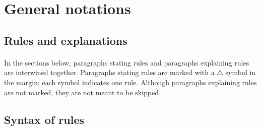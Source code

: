 \documentclass[%
	a4paper%
	,10pt%
	,twoside%
	,notitlepage%
]{article}%
\newcommand*{\ruleSymbol}{\textjapanese{⚠}}%
\begin{document}
\section{General notations}\label{sec:gen}%
% 
	\subsection{Rules and explanations}\label{subsec:rule}%
		\paragraph*{}In the sections below, paragraphs stating rules and paragraphs explaining rules are interwined together. Paragraphs stating rules are marked with a \ruleSymbol{} symbol in the margin; each symbol indicates one rule. Although paragraphs explaining rules are not marked, they are not meant to be skipped. %
	\subsection{Syntax of rules}\label{subsec:syntax}%
\end{document}
